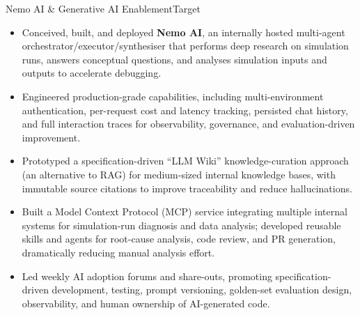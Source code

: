 \documentclass[11pt,a4paper]{moderncv}
\begin{document}
\nopagebreak
    {Nemo AI \& Generative AI Enablement}{Target}{}{}{
    \begin{itemize}
        \item Conceived, built, and deployed \textbf{Nemo AI}, an internally hosted multi-agent orchestrator/executor/synthesiser that performs deep research on simulation runs, answers conceptual questions, and analyses simulation inputs and outputs to accelerate debugging.
        \item Engineered production-grade capabilities, including multi-environment authentication, per-request cost and latency tracking, persisted chat history, and full interaction traces for observability, governance, and evaluation-driven improvement.
        \item Prototyped a specification-driven ``LLM Wiki'' knowledge-curation approach (an alternative to RAG) for medium-sized internal knowledge bases, with immutable source citations to improve traceability and reduce hallucinations.
        \item Built a Model Context Protocol (MCP) service integrating multiple internal systems for simulation-run diagnosis and data analysis; developed reusable skills and agents for root-cause analysis, code review, and PR generation, dramatically reducing manual analysis effort.
        \item Led weekly AI adoption forums and share-outs, promoting specification-driven development, testing, prompt versioning, golden-set evaluation design, observability, and human ownership of AI-generated code.
    \end{itemize}
    }
\end{document}
